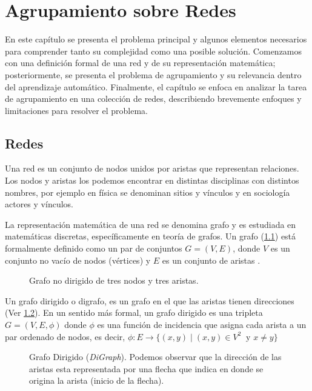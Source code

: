 
\chapter{Agrupamiento sobre Redes} %
\label{chapter:2}

En este capítulo se presenta el problema principal y algunos elementos necesarios para comprender tanto su complejidad como una posible solución. Comenzamos con una definición formal de una red y de su representación matemática; posteriormente, se presenta el problema de agrupamiento y su relevancia dentro del aprendizaje automático. Finalmente, el capítulo se enfoca en analizar la tarea de agrupamiento en una colección de redes, describiendo brevemente enfoques y limitaciones para resolver el problema. 

\section{Redes}

Una red es un conjunto de nodos unidos por aristas que representan relaciones. Los nodos y aristas los podemos encontrar en distintas disciplinas con distintos nombres, por ejemplo en física se denominan sitios y vínculos y en sociología actores y vínculos. 

La representación matemática de una red se denomina grafo y es estudiada en matemáticas discretas, específicamente en teoría de grafos. Un grafo (\ref{fig:graph}) está formalmente definido como un par de conjuntos $G = (V,E)$, donde $V$ es un conjunto no vacío de nodos (vértices) y $E$ es un conjunto de aristas \cite{saoub_graph_2021}.

 \begin{figure}[htbp]
   \centering
   
    \caption{Grafo no dirigido de tres nodos y tres aristas.}
    \label{fig:graph}
\end{figure}

Un grafo dirigido o digrafo, es un grafo en el que las aristas tienen direcciones (Ver \ref{fig:digraph}). En un sentido más formal, un grafo dirigido es una tripleta $G = (V,E,\phi)$ donde $\phi$ es una función de incidencia que asigna cada arista a un par ordenado de nodos, es decir, $ \phi :E \to \{(x,y)\mid (x,y)\in V^{2}\ \mbox{ y } x \neq y \}$

 \begin{figure}[htbp]
   \centering
   
    \caption{Grafo Dirigido (\textit{DiGraph}). Podemos observar que la dirección de las aristas esta representada por una flecha que indica en donde se origina la arista (inicio de la flecha).}
    \label{fig:digraph}
\end{figure}


